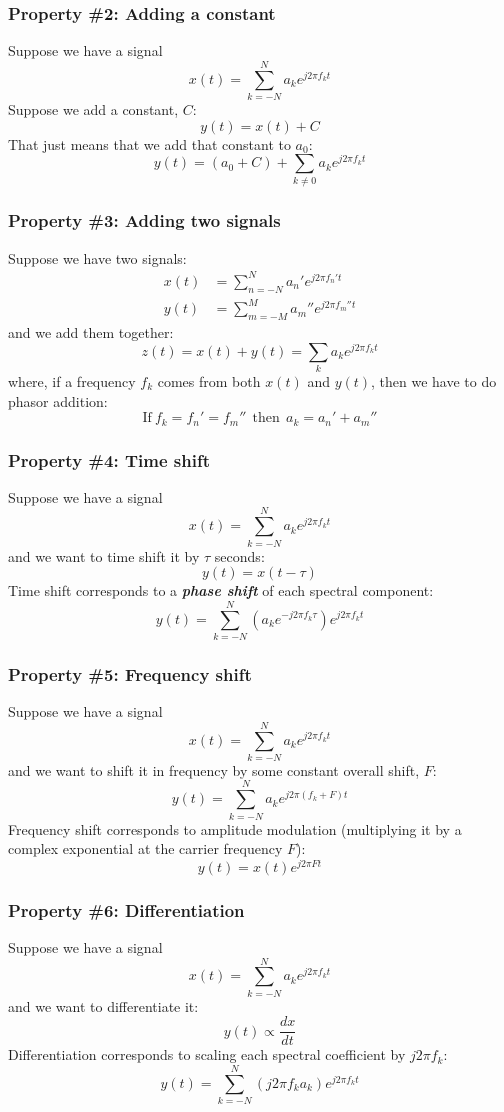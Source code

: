 \documentclass{beamer}
\begin{document}
\begin{frame}
  \frametitle{Property \#2: Adding a constant}

  Suppose we have a signal
  \[
  x(t) = \sum_{k=-N}^N a_ke^{j2\pi f_kt}
  \]
  Suppose we add a constant, $C$:
  \[
  y(t) = x(t) + C
  \]
  That just means that we add that constant to $a_0$:
  \[
  y(t)  = (a_0+C) + \sum_{k\ne 0} a_k e^{j2\pi f_kt}
  \]
\end{frame}

\begin{frame}
  \frametitle{Property \#3: Adding two signals}

  Suppose we have two signals:
  \begin{align*}
    x(t) &= \sum_{n=-N}^N a_n'e^{j2\pi f_n't}\\
    y(t) &= \sum_{m=-M}^M a_m''e^{j2\pi f_m''t}
  \end{align*}
  and we add them together:
  \[
  z(t) = x(t) + y(t) = \sum_k a_ke^{j2\pi f_kt}
  \]
  where, if a frequency $f_k$ comes from both $x(t)$ and $y(t)$, then
  we have to do phasor addition:
  \[
  \mbox{If}~f_k=f_n'=f_m''~~\mbox{then}~~a_k=a_n'+a_m''
  \]
\end{frame}

\begin{frame}
  \frametitle{Property \#4: Time shift}

  Suppose we have a signal
  \[
  x(t) = \sum_{k=-N}^N a_ke^{j2\pi f_kt}
  \]
  and we want to time shift it by $\tau$ seconds:
  \[
  y(t) = x(t-\tau)
  \]
  Time shift corresponds to a {\em\bf phase shift} of each spectral component:
  \[
  y(t) = \sum_{k=-N}^N \left(a_ke^{-j2\pi f_k\tau}\right)e^{j2\pi f_kt}
  \]
\end{frame}

\begin{frame}
  \frametitle{Property \#5: Frequency shift}

  Suppose we have a signal
  \[
  x(t) = \sum_{k=-N}^N a_ke^{j2\pi f_kt}
  \]
  and we want to shift it in frequency by some constant overall shift, $F$:
  \[
  y(t) = \sum_{k=-N}^N a_ke^{j2\pi \left(f_k+F\right)t}
  \]
  Frequency shift corresponds to amplitude modulation (multiplying it by a
  complex exponential at the carrier frequency $F$):
  \[
  y(t) = x(t) e^{j2\pi Ft}
  \]
\end{frame}

\begin{frame}
  \frametitle{Property \#6: Differentiation}

  Suppose we have a signal
  \[
  x(t) = \sum_{k=-N}^N a_ke^{j2\pi f_kt}
  \]
  and we want to differentiate it:
  \[
  y(t) \propto \frac{dx}{dt}
  \]
  Differentiation corresponds to scaling each spectral coefficient by
  $j2\pi f_k$:
  \[
  y(t) = \sum_{k=-N}^N \left(j2\pi f_k a_k\right)e^{j2\pi f_kt}
  \]
\end{frame}
\end{document}
